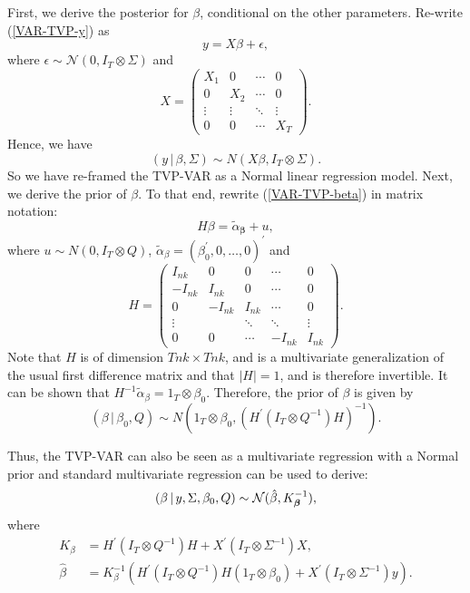 \documentclass{article}
\begin{document}
First, we derive the posterior for $\beta $, conditional on the other
parameters. Re-write (\ref{VAR-TVP-y}) as 
\begin{equation*}
y=X\beta +\epsilon ,
\end{equation*}%
where $\epsilon \sim {\mathcal{N}}(0,I_{T}\otimes \Sigma )$ and 
\begin{equation*}
X=%
\begin{pmatrix}
X_{1} & 0 & \cdots & 0 \\ 
0 & X_{2} & \cdots & 0 \\ 
\vdots & \vdots & \ddots & \vdots \\ 
0 & 0 & \cdots & X_{T}%
\end{pmatrix}%
.
\end{equation*}%
Hence, we have 
\begin{equation*}
(y\,|\,\beta ,\Sigma )\sim N(X\beta ,I_{T}\otimes \Sigma ).
\end{equation*}%
So we have re-framed the TVP-VAR as a Normal linear regression model. Next,
we derive the prior of $\beta $. To that end, rewrite (\ref{VAR-TVP-beta})
in matrix notation: 
\begin{equation*}
H\beta =\tilde{\alpha}_{\boldsymbol{\beta }}+u,
\end{equation*}%
where $u\sim N(0,I_{T}\otimes Q)$, $\tilde{\alpha}_{\beta }=(\beta
_{0}^{\prime },0,\ldots ,0)^{\prime }$ and 
\begin{equation*}
H=%
\begin{pmatrix}
I_{nk} & 0 & 0 & \cdots & 0 \\ 
-I_{nk} & I_{nk} & 0 & \cdots & 0 \\ 
0 & -I_{nk} & I_{nk} & \cdots & 0 \\ 
\vdots &  & \ddots & \ddots & \vdots \\ 
0 & 0 & \cdots & -I_{nk} & I_{nk}%
\end{pmatrix}%
.
\end{equation*}%
Note that $H$ is of dimension $Tnk\times Tnk$, and is a multivariate
generalization of the usual first difference matrix and that $|H|=1$, and is
therefore invertible. It can be shown that $H^{-1}\tilde{\alpha}_{\beta
}=1_{T}\otimes \beta _{0}$. Therefore, the prior of $\beta $ is given by 
\begin{equation*}
(\beta \,|\,\beta _{0},Q)\sim N(1_{T}\otimes \beta _{0},(H^{\prime
}(I_{T}\otimes Q^{-1})H)^{-1}).
\end{equation*}

Thus, the TVP-VAR can also be seen as a multivariate regression with a
Normal prior and standard multivariate regression can be used to derive: 
\begin{equation*}
(\beta \,|\,y,\Sigma ,\beta _{0},Q)\sim {\mathcal{N}}(\hat{\beta},K_{%
\boldsymbol{\beta }}^{-1}),
\end{equation*}%
where 
\begin{align*}
K_{\beta }& =H^{\prime }(I_{T}\otimes Q^{-1})H+X^{\prime }(I_{T}\otimes
\Sigma ^{-1})X, \\
\hat{\beta}& =K_{\beta }^{-1}\left( H^{\prime }(I_{T}\otimes
Q^{-1})H(1_{T}\otimes \beta _{0})+X^{\prime }(I_{T}\otimes \Sigma
^{-1})y\right) .
\end{align*}
\end{document}
